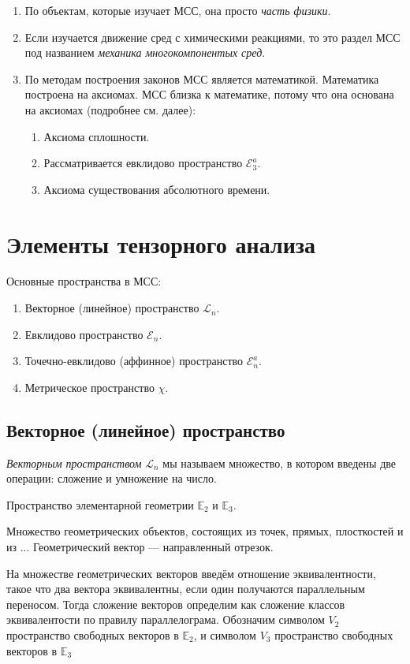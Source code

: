 \begin{enumerate}
  \item По объектам, которые изучает МСС, она просто \textsl{часть физики}.
  \item Если изучается движение сред с химическими реакциями, то это раздел МСС
    под названием
    \emph{механика
  многокомпонентых сред}.
  \item По методам построения законов МСС является математикой. Математика построена на аксиомах.
    МСС близка к математике, потому что она основана на аксиомах (подробнее см.
    далее):
  \begin{enumerate}[label=$\mathscr{A}_{\arabic*}$.]
      \item Аксиома сплошности.
      \item Рассматривается евклидово пространство $\mathcal{E}_3^a$.
      \item Аксиома существования абсолютного времени.
\end{enumerate}
\end{enumerate}



\section{Элементы тензорного анализа}
Основные пространства в МСС:
\begin{enumerate}
  \item Векторное (линейное) пространство $\mathcal{L}_n$.  
  \item Евклидово пространство $\mathcal{E}_n$.
  \item Точечно-евклидово (аффинное) пространство $\mathcal{E}_n^a$.
  \item Метрическое пространство $ \chi $.
\end{enumerate}


\subsection{Векторное (линейное) пространство}
\begin{definition}
  \emph{Векторным пространством} $\mathcal{L}_n$ мы называем множество, в котором введены две операции: сложение и
  умножение на число.
\end{definition}

\begin{example}
  Пространство элементарной геометрии $\mathbb{E}_2$ и $\mathbb{E}_3$.

  Множество геометрических объектов, состоящих из точек, прямых, плосткостей и из ... Геометрический
  вектор --- направленный отрезок.

  На множестве геометрических векторов введём отношение эквивалентности, такое что два вектора
  эквивалентны, если один получаются параллельным переносом. Тогда сложение векторов определим
  как сложение классов эквивалентости по правилу параллелограма. 
   Обозначим символом $V_2$ пространство свободных векторов в $\mathbb E_2$,
  и символом $V_3$ пространство свободных векторов в $\mathbb E_3$
\end{example}

